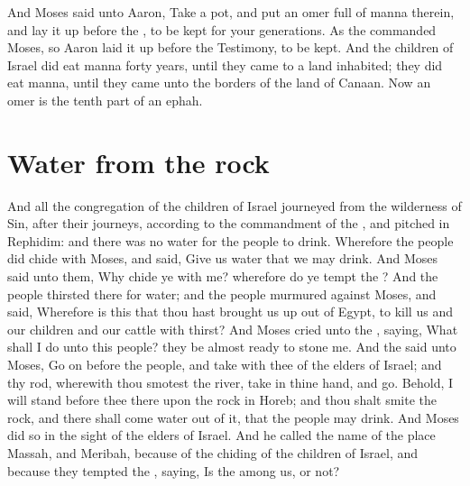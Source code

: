 \begin{biblechapter}
\verse And Moses said unto Aaron, Take a pot, and put an omer full of manna therein, and lay it up before the \LORD, to be kept for your generations.
\verse As the \LORD commanded Moses, so Aaron laid it up before the Testimony, to be kept.
\verse And the children of Israel did eat manna forty years, until they came to a land inhabited; they did eat manna, until they came unto the borders of the land of Canaan.
\verse Now an omer is the tenth part of an ephah.
\end{biblechapter}

\section*{Water from the rock}
\begin{biblechapter} %
\verse And all the congregation of the children of Israel journeyed from the wilderness of Sin, after their journeys, according to the commandment of the \LORD, and pitched in Rephidim: and there was no water for the people to drink.
\verse Wherefore the people did chide with Moses, and said, Give us water that we may drink. And Moses said unto them, Why chide ye with me? wherefore do ye tempt the \LORD?
\verse And the people thirsted there for water; and the people murmured against Moses, and said, Wherefore is this that thou hast brought us up out of Egypt, to kill us and our children and our cattle with thirst?
\verse And Moses cried unto the \LORD, saying, What shall I do unto this people? they be almost ready to stone me.
\verse And the \LORD said unto Moses, Go on before the people, and take with thee of the elders of Israel; and thy rod, wherewith thou smotest the river, take in thine hand, and go.
\verse Behold, I will stand before thee there upon the rock in Horeb; and thou shalt smite the rock, and there shall come water out of it, that the people may drink. And Moses did so in the sight of the elders of Israel.
\verse And he called the name of the place Massah, and Meribah, because of the chiding of the children of Israel, and because they tempted the \LORD, saying, Is the \LORD among us, or not?

\end{biblechapter}
